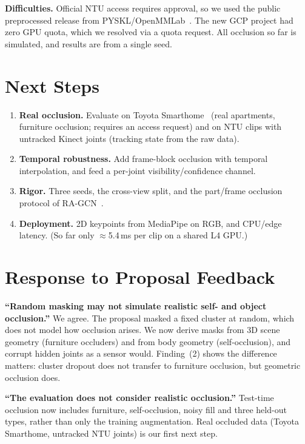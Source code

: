 \documentclass[11pt,twocolumn,letterpaper]{article}
\begin{document}
\textbf{Difficulties.} Official NTU access requires approval, so we used the public preprocessed
release from PYSKL/OpenMMLab~\cite{duan2022pyskl}. The new GCP project had zero GPU quota, which we resolved via a quota request.
All occlusion so far is simulated, and results are from a single seed.

\section{Next Steps}
\begin{enumerate}
\item \textbf{Real occlusion.} Evaluate on Toyota Smarthome~\cite{das2019toyota} (real apartments, furniture occlusion; requires an access request) and on NTU clips with untracked Kinect joints (tracking state from the raw data).
\item \textbf{Temporal robustness.} Add frame-block occlusion with temporal interpolation, and feed a per-joint visibility/confidence channel.
\item \textbf{Rigor.} Three seeds, the cross-view split, and the part/frame occlusion protocol of RA-GCN~\cite{song2020ragcn}.
\item \textbf{Deployment.} 2D keypoints from MediaPipe on RGB, and CPU/edge latency. (So far only $\approx$5.4\,ms per clip on a shared L4 GPU.)
\end{enumerate}

\section{Response to Proposal Feedback}\label{sec:resp}
\textbf{``Random masking may not simulate realistic self- and object occlusion.''}
We agree. The proposal masked a fixed cluster at random, which does not model how occlusion arises.
We now derive masks from 3D scene geometry (furniture occluders) and from body geometry (self-occlusion), and corrupt hidden joints as a sensor would.
Finding~(2) shows the difference matters: cluster dropout does not transfer to furniture occlusion, but geometric occlusion does.

\textbf{``The evaluation does not consider realistic occlusion.''}
Test-time occlusion now includes furniture, self-occlusion, noisy fill and three held-out types, rather than only the training augmentation.
Real occluded data (Toyota Smarthome, untracked NTU joints) is our first next step.

{\small


}
\end{document}
